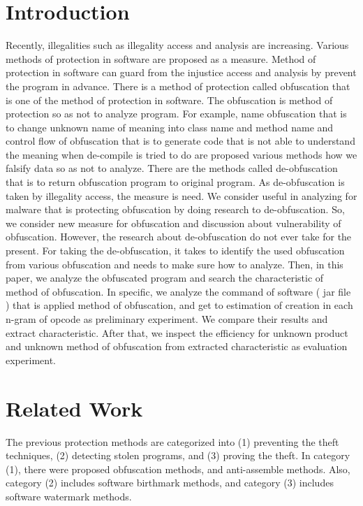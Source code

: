 \documentclass[conference]{IEEEtran}
\begin{document}
\section{Introduction}
Recently, illegalities such as illegality access and analysis are
increasing.  Various methods of protection in software are proposed as
a measure.  Method of protection in software can guard from the
injustice access and analysis by prevent the program in advance.
There is a method of protection called obfuscation that is one of the
method of protection in software.  The obfuscation is method of
protection so as not to analyze program.
%
For example, name obfuscation that is to change unknown name of
meaning into class name and method name and control flow of
obfuscation that is to generate code that is not able to understand
the meaning when de-compile is tried to do are proposed various
methods how we falsify data so as not to analyze.  There are the
methods called de-obfuscation that is to return obfuscation program to
original program.  As de-obfuscation is taken by illegality access,
the measure is need.  We consider useful in analyzing for malware that
is protecting obfuscation by doing research to de-obfuscation.  So, we
consider new measure for obfuscation and discussion about
vulnerability of obfuscation.  However, the research about
de-obfuscation do not ever take for the present.  For taking the
de-obfuscation, it takes to identify the used obfuscation from various
obfuscation and needs to make sure how to analyze.  Then, in this
paper, we analyze the obfuscated program and search the characteristic
of method of obfuscation.  In specific, we analyze the command of
software ( jar file ) that is applied method of obfuscation, and get
to estimation of creation in each n-gram of opcode as preliminary
experiment.  We compare their results and extract characteristic.
After that, we inspect the efficiency for unknown product and unknown
method of obfuscation from extracted characteristic as evaluation
experiment.

\section{Related Work}

The previous protection methods are categorized into (1) preventing
the theft techniques, (2) detecting stolen programs, and (3) proving
the theft\cite{collberg09surreptitious}.
%
In category (1), there were proposed obfuscation methods, and
anti-assemble methods\cite{tyma00patent,monden97ieice}.  Also,
category (2) includes software birthmark
methods\cite{tamada05ieice}, and category (3) includes software
watermark methods\cite{collberg99popl}.
\end{document}
